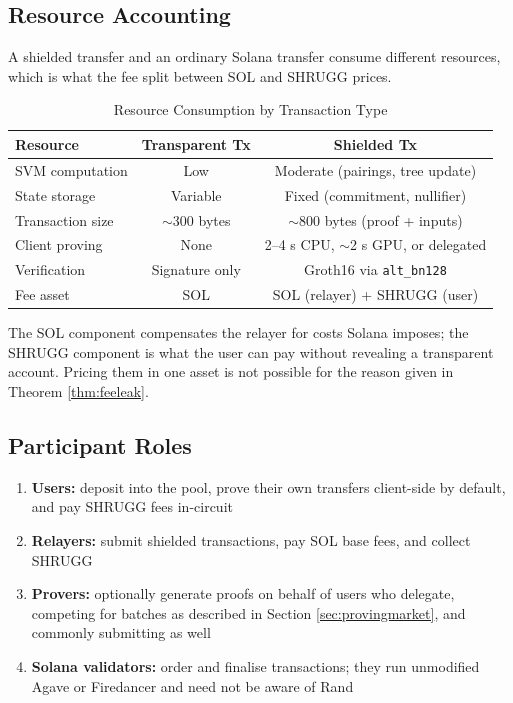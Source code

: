 \documentclass[11pt,a4paper]{article}
\begin{document}
\subsection{Resource Accounting}

A shielded transfer and an ordinary Solana transfer consume different resources, which is what the fee split between SOL and SHRUGG prices.

\begin{table}[H]
\centering
\caption{Resource Consumption by Transaction Type}
\begin{tabular}{@{}lcc@{}}
\toprule
\textbf{Resource} & \textbf{Transparent Tx} & \textbf{Shielded Tx} \\ \midrule
SVM computation & Low & Moderate (pairings, tree update) \\
State storage & Variable & Fixed (commitment, nullifier) \\
Transaction size & $\sim$300 bytes & $\sim$800 bytes (proof + inputs) \\
Client proving & None & 2--4 s CPU, $\sim$2 s GPU, or delegated \\
Verification & Signature only & Groth16 via \texttt{alt\_bn128} \\
Fee asset & SOL & SOL (relayer) + SHRUGG (user) \\ \bottomrule
\end{tabular}
\end{table}

The SOL component compensates the relayer for costs Solana imposes; the SHRUGG component is what the user can pay without revealing a transparent account. Pricing them in one asset is not possible for the reason given in Theorem \ref{thm:feeleak}.

\subsection{Participant Roles}

\begin{enumerate}
    \item \textbf{Users:} deposit into the pool, prove their own transfers client-side by default, and pay SHRUGG fees in-circuit
    \item \textbf{Relayers:} submit shielded transactions, pay SOL base fees, and collect SHRUGG
    \item \textbf{Provers:} optionally generate proofs on behalf of users who delegate, competing for batches as described in Section \ref{sec:provingmarket}, and commonly submitting as well
    \item \textbf{Solana validators:} order and finalise transactions; they run unmodified Agave or Firedancer and need not be aware of Rand
\end{enumerate}
\end{document}
